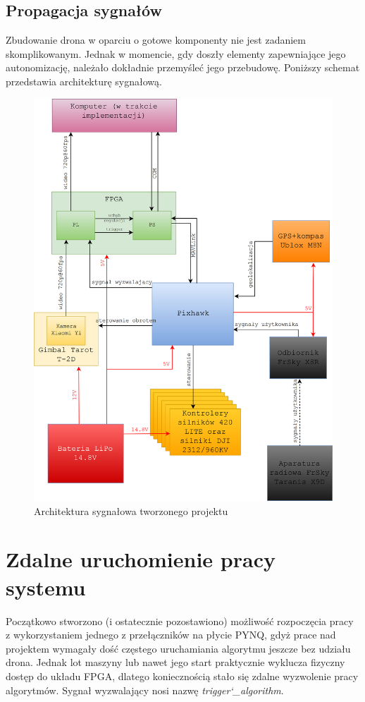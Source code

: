 \subsection{Propagacja sygnałów}
Zbudowanie drona w oparciu o gotowe komponenty nie jest zadaniem skomplikowanym. Jednak w momencie, gdy doszły elementy zapewniające jego autonomizację, należało dokładnie przemyśleć jego przebudowę. Poniższy schemat przedstawia architekturę sygnałową.
\begin{figure}[h]
	\centering
	\includegraphics[width=12cm]{5_drone_architecture.png}
	\caption{Architektura sygnałowa tworzonego projektu}
	\label{fig:architecture}
\end{figure}

\section{Zdalne uruchomienie pracy systemu}

Początkowo stworzono (i ostatecznie pozostawiono) możliwość rozpoczęcia pracy z wykorzystaniem jednego z przełączników na płycie PYNQ, gdyż prace nad projektem wymagały dość częstego uruchamiania algorytmu jeszcze bez udziału drona. Jednak lot maszyny lub nawet jego start praktycznie wyklucza fizyczny dostęp do układu FPGA, dlatego koniecznością stało się zdalne wyzwolenie pracy algorytmów. Sygnał wyzwalający nosi nazwę \textit{trigger\char`_algorithm}.

